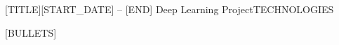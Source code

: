\resumeSubheading
{[TITLE]}{[START_DATE] -- [END]}
{Deep Learning Project}{TECHNOLOGIES}
\resumeSubHeadingList

[BULLETS]

\resumeSubHeadingListEnd